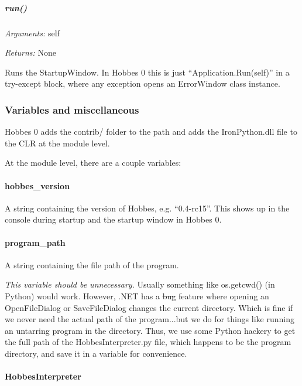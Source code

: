 \documentclass[12pt,letterpaper]{article}
\begin{document}
%
%
\subparagraph{run()}
\label{4.1.1.1.7}

\emph{Arguments:} self

\emph{Returns:} None

Runs the StartupWindow. In Hobbes 0 this is just ``Application.Run(self)'' in a try-except block, where any exception opens an ErrorWindow class instance.



%
%
\subsubsection{Variables and miscellaneous}
\label{4.1.2}

Hobbes 0 adds the contrib/ folder to the path and adds the IronPython.dll file to the CLR at the module level.

At the module level, there are a couple variables:

\setcounter{paragraph}{-1}



%
%
\paragraph{hobbes\_version}
\label{4.1.2.0}

A string containing the version of Hobbes, e.g. ``0.4-rc15''. This shows up in the console during startup and the startup window in Hobbes 0.



%
%
\paragraph{program\_path}
\label{4.1.2.1}

A string containing the file path of the program.

\emph{This variable should be unnecessary.} Usually something like os.getcwd() (in Python) would work. However, .NET has a \sout{bug} feature where opening an OpenFileDialog or SaveFileDialog changes the current directory. Which is fine if we never need the actual path of the program...but we do for things like running an untarring program in the directory. Thus, we use some Python hackery to get the full path of the HobbesInterpreter.py file, which happens to be the program directory, and save it in a variable for convenience.



%
%
\paragraph{HobbesInterpreter}
\label{4.1.2.2}
\end{document}
